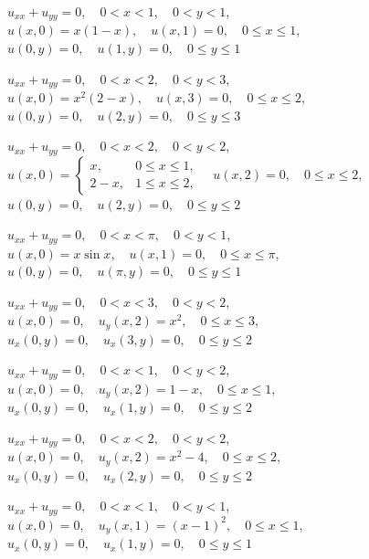 \begin{exerciselist}
  \item\label{exer:12.3.1} $u_{xx}+u_{yy}=0,\quad0<x<1,\quad0<y<1$,\\ $u(x,0)=x(1-x),\quad u(x,1)=0,\quad0\le x\le1$,\\ $u(0,y)=0,\quad u(1,y)=0,\quad0\le y\le1$

  \item\label{exer:12.3.2} $u_{xx}+u_{yy}=0,\quad0<x<2,\quad0<y<3$,\\ $u(x,0)=x^{2}(2-x),\quad u(x,3)=0,\quad0\le x\le2$,\\ $u(0,y)=0,\quad u(2,y)=0,\quad0\le y\le3$

  \item\label{exer:12.3.3} \Cex $u_{xx}+u_{yy}=0,\quad0<x<2,\quad0<y<2$,\\ $u(x,0)= \left\{
  \begin{array}{cl}
    x,   & 0\le x\le1, \\
    2-x, & 1\le x\le2,
  \end{array}\right. \quad u(x,2)=0,\quad0\le x\le2$,\\ $u(0,y)=0,\quad u(2,y)=0,\quad0\le y\le2$

  \item\label{exer:12.3.4} $u_{xx}+u_{yy}=0,\quad0<x<\pi,\quad0<y<1$,\\ $u(x,0)=x\sin x,\quad u(x,1)=0,\quad0\le x\le\pi$,\\ $u(0,y)=0,\quad u(\pi,y)=0,\quad0\le y\le1$

  \item\label{exer:12.3.5} $u_{xx}+u_{yy}=0,\quad0<x<3,\quad0<y<2$,\\ $u(x,0)=0,\quad u_{y}(x,2)=x^{2},\quad0\le x\le3$,\\ $u_{x}(0,y)=0,\quad u_{x}(3,y)=0,\quad0\le y\le2$

  \item\label{exer:12.3.6} $u_{xx}+u_{yy}=0,\quad0<x<1,\quad0<y<2$,\\ $u(x,0)=0,\quad u_{y}(x,2)=1-x,\quad0\le x\le1$,\\ $u_{x}(0,y)=0,\quad u_{x}(1,y)=0,\quad0\le y\le2$

  \item\label{exer:12.3.7} $u_{xx}+u_{yy}=0,\quad0<x<2,\quad0<y<2$,\\ $u(x,0)=0,\quad u_{y}(x,2)=x^{2}-4,\quad0\le x\le2$,\\ $u_{x}(0,y)=0,\quad u_{x}(2,y)=0,\quad0\le y\le2$

  \item\label{exer:12.3.8} $u_{xx}+u_{yy}=0,\quad0<x<1,\quad0<y<1$,\\ $u(x,0)=0,\quad u_{y}(x,1)=(x-1)^{2},\quad0\le x\le1$,\\ $u_{x}(0,y)=0,\quad u_{x}(1,y)=0,\quad0\le y\le1$


\end{exerciselist}
